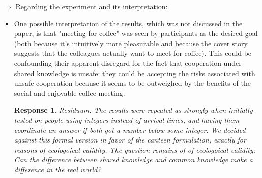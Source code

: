 \documentclass[a4paper]{article}
\newtheorem{response}{Response}
\newenvironment{robin}{\smallskip \noindent \color{red!10!green!50!blue}}{\color{black}\smallskip}
\begin{document}
$\Rightarrow$ Regarding the experiment and its interpretation:
\begin{itemize}
  \item One possible interpretation of the results, which was not discussed in the paper, is that "meeting for coffee" was seen by participants as the desired goal (both because it's intuitively more pleasurable and because the cover story suggests that the colleagues actually want to meet for coffee). This could be confounding their apparent disregard for the fact that cooperation under shared knowledge is unsafe: they could be accepting the risks associated with unsafe cooperation because it seems to be outweighed by the benefits of the social and enjoyable coffee meeting. 

 \begin{response}\label{canteenpref2}
\begin{robin}
Residuum: The results were repeated as strongly when initially tested on people using integers instead of arrival times, and having them coordinate an answer if both got a number below some integer. We decided against this formal version in favor of the canteen formulation, exactly for reasons of ecologoical validity. The question remains of of ecologoical validity: Can the difference between shared knowledge and common knowledge make a difference in the real world? 


\end{robin}
\end{response}
\end{itemize}
\end{document}
